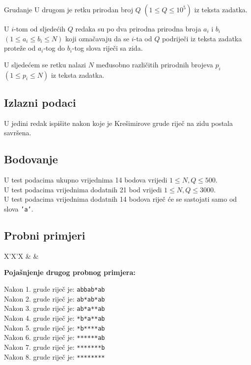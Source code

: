 \begin{statement}[
  problempoints=70,
  timelimit=2 sekunde,
  memorylimit=512 MiB,
]{Grudanje}
U drugom je retku prirodan broj $Q$ $(1 \le Q \le 10^5)$ iz teksta zadatka.

U $i$-tom od sljedećih $Q$ redaka su po dva prirodna prirodna broja $a_i$ i
$b_i$ $(1 \le a_i \le b_i \le N)$ koji označavaju da se $i$-ta od $Q$ podriječi iz
teksta zadatka proteže od $a_i$-tog do $b_i$-tog slova riječi sa zida.

U sljedećem se retku nalazi $N$ međusobno različitih prirodnih brojeva $p_i$
$(1 \le p_i \le N)$ iz teksta zadatka.

\subsection*{Izlazni podaci}
U jedini redak ispišite nakon koje je Krešimirove grude riječ na zidu postala
savršena.

 \subsection*{Bodovanje}
U test podacima ukupno vrijednima 14 bodova vrijedi $1 \le N, Q \le 500$. \\
U test podacima vrijednima dodatnih 21 bod vrijedi $1 \le N, Q \le 3000$. \\
U test podacima vrijednima dodatnih 14 bodova riječ će se sastojati samo od
slova \texttt{'a'}.


\subsection*{Probni primjeri}
\begin{tabularx}{\textwidth}{X'X'X}
 &
 &
\end{tabularx}

\textbf{Pojašnjenje drugog probnog primjera:}

Nakon 1. grude riječ je: \texttt{abbab*ab} \\
Nakon 2. grude riječ je: \texttt{ab*ab*ab} \\
Nakon 3. grude riječ je: \texttt{ab*a**ab} \\
Nakon 4. grude riječ je: \texttt{*b*a**ab} \\
Nakon 5. grude riječ je: \texttt{*b****ab} \\
Nakon 6. grude riječ je: \texttt{******ab} \\
Nakon 7. grude riječ je: \texttt{*******b} \\
Nakon 8. grude riječ je: \texttt{********}

\end{statement}

